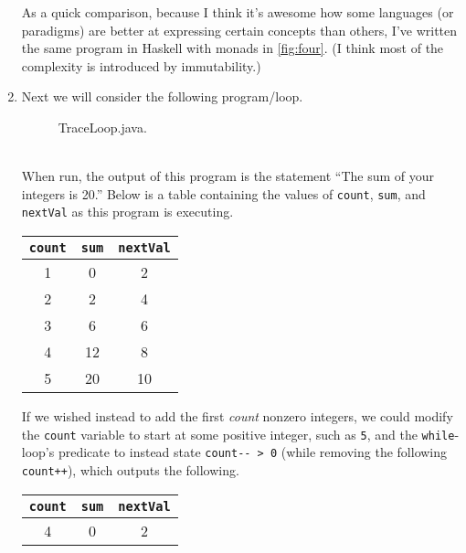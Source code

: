\documentclass[leqno, 11pt]{article}
\begin{document}
\begin{enumerate}
        As a quick comparison, because I think it's awesome how some languages (or paradigms) are better at expressing certain concepts than others, I've written the same program in Haskell with monads in \autoref{fig:four}. (I think most of the complexity is introduced by immutability.)
  \item Next we will consider the following program/loop.
        \begin{figure}[h!]
          \centering
          
          \caption{TraceLoop.java.}
          \label{fig:five}
        \end{figure}\\
        When run, the output of this program is the statement ``The sum of your integers is 20.'' Below is a table containing the values of \texttt{count}, \texttt{sum}, and \texttt{nextVal} as this program is executing.
        \begin{center}
          \begin{tabular}{|c|c|c|}
            \hline
            \rowcolor{tableheaderrow}
            \texttt{count} & \texttt{sum} & \texttt{nextVal}\\
            \hline
            1 & 0  & 2  \\
            \hline
            2 & 2  & 4  \\
            \hline
            3 & 6  & 6  \\
            \hline
            4 & 12 & 8  \\
            \hline
            5 & 20 & 10 \\
            \hline
          \end{tabular}
        \end{center}
        If we wished instead to add the first \textit{count} nonzero integers, we could modify the \texttt{count} variable to start at some positive integer, such as \texttt{5}, and the \texttt{while}-loop's predicate to instead state \verb|count-- > 0| (while removing the following  \texttt{count++}), which outputs the following.
        \begin{center}
          \begin{tabular}{|c|c|c|}
            \hline
            \rowcolor{tableheaderrow}
            \texttt{count} & \texttt{sum} & \texttt{nextVal}\\
            \hline
             4 & 0  & 2  \\
            \hline

\end{tabular}
\end{center}
\end{enumerate}
\end{document}
